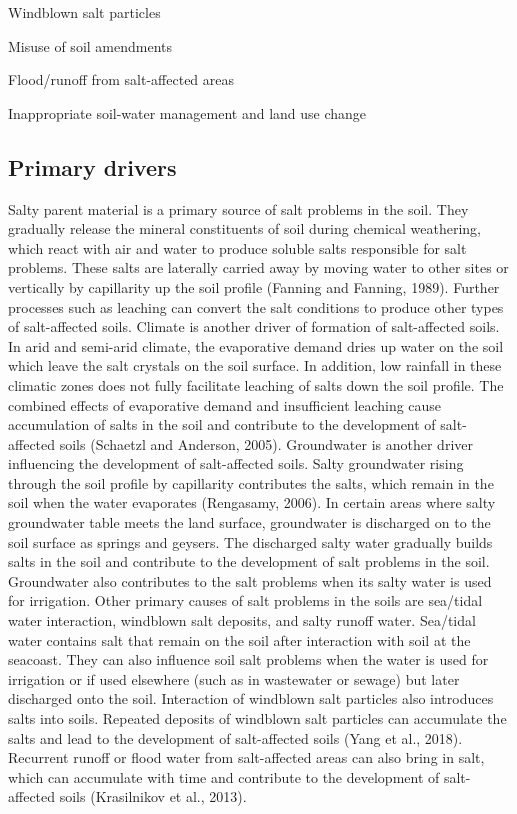 \documentclass[
  10pt,
  b5paper,
]{book}
\begin{document}
Windblown salt particles

Misuse of soil amendments

Flood/runoff from salt-affected areas

Inappropriate soil-water management and land use change

\hypertarget{primary-drivers}{%
\subsection{Primary drivers}\label{primary-drivers}}

Salty parent material is a primary source of salt problems in the soil. They gradually release the mineral constituents of soil during chemical weathering, which react with air and water to produce soluble salts responsible for salt problems. These salts are laterally carried away by moving water to other sites or
vertically by capillarity up the soil profile (Fanning and Fanning, 1989). Further processes such as leaching can convert the salt conditions to produce other types of salt-affected soils.
Climate is another driver of formation of salt-affected soils. In arid and semi-arid climate, the evaporative demand dries up water on the soil which leave the salt crystals on the soil surface. In addition, low rainfall in these climatic zones does not fully facilitate leaching of salts down the soil profile. The combined effects of evaporative demand and insufficient leaching cause accumulation of salts in the soil and contribute to the development of salt-affected soils (Schaetzl and Anderson, 2005).
Groundwater is another driver influencing the development of salt-affected soils. Salty groundwater rising through the soil profile by capillarity contributes the salts, which remain in the soil when the water evaporates (Rengasamy, 2006). In certain areas where salty groundwater table meets the land surface, groundwater is discharged on to the soil surface as springs and geysers. The discharged salty water gradually builds salts in the soil and contribute to the development of salt problems in the soil. Groundwater also contributes to the salt problems when its salty water is used for irrigation.
Other primary causes of salt problems in the soils are sea/tidal water interaction, windblown salt deposits, and salty runoff water. Sea/tidal water contains salt that remain on the soil after interaction with soil at the seacoast. They can also influence soil salt problems when the water is used for irrigation or if used elsewhere (such as in wastewater or sewage) but later discharged onto the soil. Interaction of windblown salt particles also introduces salts into soils. Repeated deposits of windblown salt particles can accumulate the salts and lead to the development of salt-affected soils (Yang et al., 2018). Recurrent runoff or flood water from salt-affected areas can also bring in salt, which can accumulate with time and contribute to the development of salt-affected soils (Krasilnikov et al., 2013).
\end{document}
